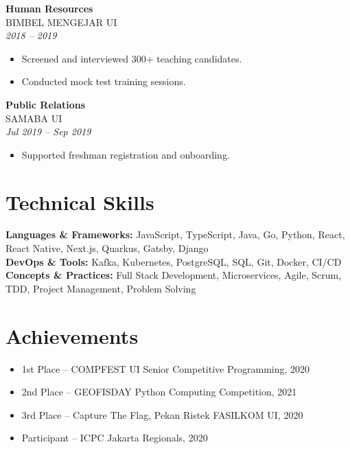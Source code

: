 \documentclass[11pt,a4paper]{article}
\begin{document}
\textbf{Human Resources} \\
BIMBEL MENGEJAR UI \\
\textit{2018 -- 2019}
\begin{itemize}[leftmargin=*]
    \item Screened and interviewed 300+ teaching candidates.
    \item Conducted mock test training sessions.
\end{itemize}

\textbf{Public Relations} \\
SAMABA UI \\
\textit{Jul 2019 -- Sep 2019}
\begin{itemize}[leftmargin=*]
    \item Supported freshman registration and onboarding.
\end{itemize}

\section*{Technical Skills}

\textbf{Languages \& Frameworks:} JavaScript, TypeScript, Java, Go, Python, React, React Native, Next.js, Quarkus, Gatsby, Django \\
\textbf{DevOps \& Tools:} Kafka, Kubernetes, PostgreSQL, SQL, Git, Docker, CI/CD \\
\textbf{Concepts \& Practices:} Full Stack Development, Microservices, Agile, Scrum, TDD, Project Management, Problem Solving

\section*{Achievements}

\begin{itemize}[leftmargin=*]
    \item 1st Place – COMPFEST UI Senior Competitive Programming, 2020
    \item 2nd Place – GEOFISDAY Python Computing Competition, 2021
    \item 3rd Place – Capture The Flag, Pekan Ristek FASILKOM UI, 2020
    \item Participant – ICPC Jakarta Regionals, 2020
\end{itemize}
\end{document}

